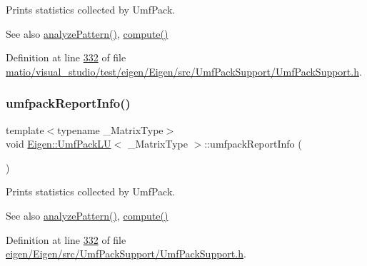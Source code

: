 Prints statistics collected by Umf\+Pack.

\begin{DoxySeeAlso}{See also}
\hyperlink{class_eigen_1_1_umf_pack_l_u_ac7ea28b2017d6b26b7b08497f294e5e6}{analyze\+Pattern()}, \hyperlink{class_eigen_1_1_umf_pack_l_u_a05fb2b5717ebd67e46b83439721ceee7}{compute()} 
\end{DoxySeeAlso}


Definition at line \hyperlink{matio_2visual__studio_2test_2eigen_2_eigen_2src_2_umf_pack_support_2_umf_pack_support_8h_source_l00332}{332} of file \hyperlink{matio_2visual__studio_2test_2eigen_2_eigen_2src_2_umf_pack_support_2_umf_pack_support_8h_source}{matio/visual\+\_\+studio/test/eigen/\+Eigen/src/\+Umf\+Pack\+Support/\+Umf\+Pack\+Support.\+h}.

\mbox{\label{class_eigen_1_1_umf_pack_l_u_afad062dfc49ca6d2d19d534b3f8f8d28}} 
\subsubsection{\texorpdfstring{umfpack\+Report\+Info()}{umfpackReportInfo()}\hspace{0.1cm}{\footnotesize\ttfamily [2/2]}}
{\footnotesize\ttfamily template$<$typename \+\_\+\+Matrix\+Type$>$ \\
void \hyperlink{class_eigen_1_1_umf_pack_l_u}{Eigen\+::\+Umf\+Pack\+LU}$<$ \+\_\+\+Matrix\+Type $>$\+::umfpack\+Report\+Info (\begin{DoxyParamCaption}{ }\end{DoxyParamCaption})\hspace{0.3cm}{\ttfamily [inline]}}

Prints statistics collected by Umf\+Pack.

\begin{DoxySeeAlso}{See also}
\hyperlink{class_eigen_1_1_umf_pack_l_u_ac7ea28b2017d6b26b7b08497f294e5e6}{analyze\+Pattern()}, \hyperlink{class_eigen_1_1_umf_pack_l_u_a05fb2b5717ebd67e46b83439721ceee7}{compute()} 
\end{DoxySeeAlso}


Definition at line \hyperlink{eigen_2_eigen_2src_2_umf_pack_support_2_umf_pack_support_8h_source_l00332}{332} of file \hyperlink{eigen_2_eigen_2src_2_umf_pack_support_2_umf_pack_support_8h_source}{eigen/\+Eigen/src/\+Umf\+Pack\+Support/\+Umf\+Pack\+Support.\+h}.

